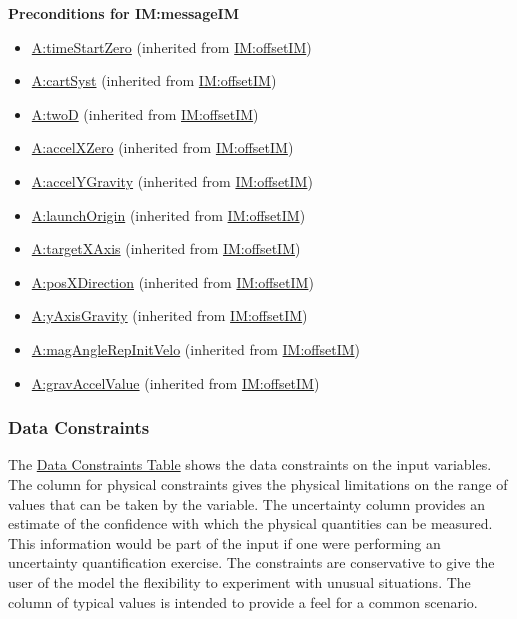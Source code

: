 \documentclass[12pt]{article}
\begin{document}
\noindent \textbf{Preconditions for IM:messageIM}
\begin{itemize}
\item \hyperref[timeStartZero]{A:timeStartZero} (inherited from \hyperref[IM:offsetIM]{IM:offsetIM})
\item \hyperref[cartSyst]{A:cartSyst} (inherited from \hyperref[IM:offsetIM]{IM:offsetIM})
\item \hyperref[twoD]{A:twoD} (inherited from \hyperref[IM:offsetIM]{IM:offsetIM})
\item \hyperref[accelXZero]{A:accelXZero} (inherited from \hyperref[IM:offsetIM]{IM:offsetIM})
\item \hyperref[accelYGravity]{A:accelYGravity} (inherited from \hyperref[IM:offsetIM]{IM:offsetIM})
\item \hyperref[launchOrigin]{A:launchOrigin} (inherited from \hyperref[IM:offsetIM]{IM:offsetIM})
\item \hyperref[targetXAxis]{A:targetXAxis} (inherited from \hyperref[IM:offsetIM]{IM:offsetIM})
\item \hyperref[posXDirection]{A:posXDirection} (inherited from \hyperref[IM:offsetIM]{IM:offsetIM})
\item \hyperref[yAxisGravity]{A:yAxisGravity} (inherited from \hyperref[IM:offsetIM]{IM:offsetIM})
\item \hyperref[magAngleRepInitVelo]{A:magAngleRepInitVelo} (inherited from \hyperref[IM:offsetIM]{IM:offsetIM})
\item \hyperref[gravAccelValue]{A:gravAccelValue} (inherited from \hyperref[IM:offsetIM]{IM:offsetIM})

\end{itemize}

\subsubsection{Data Constraints}
\label{Sec:DataConstraints}
The \hyperref[Table:InDataConstraints]{Data Constraints Table} shows the data constraints on the input variables. The column for physical constraints gives the physical limitations on the range of values that can be taken by the variable. The uncertainty column provides an estimate of the confidence with which the physical quantities can be measured. This information would be part of the input if one were performing an uncertainty quantification exercise. The constraints are conservative to give the user of the model the flexibility to experiment with unusual situations. The column of typical values is intended to provide a feel for a common scenario.
\end{document}
